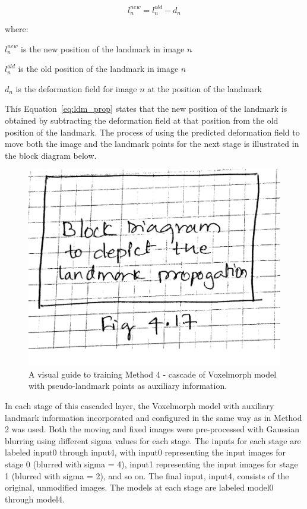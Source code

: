 \documentclass{report}
\begin{document}
	\begin{equation}\label{eq:ldm_prop}
		l_n^{new} = l_n^{old} - d_n
	\end{equation}
	
	where:
	
	$l_n^{new}$ is the new position of the landmark in image $n$
	
	$l_n^{old}$ is the old position of the landmark in image $n$
	
	$d_n$ is the deformation field for image $n$ at the position of the landmark
	
	This Equation~\ref{eq:ldm_prop} states that the new position of the landmark is obtained by subtracting the deformation field at that position from the old position of the landmark. The process of using the predicted deformation field to move both the image and the landmark points for the next stage is illustrated in the block diagram below.
	
	\begin{figure}[h!]
		\centering
		\includegraphics[width=0.6\columnwidth]{resources/chapter4/block_diagram_method_4.png}
		\caption{A visual guide to training Method 4 - cascade of Voxelmorph model with pseudo-landmark points as auxiliary information.}
		\label{fig:block_method4}
	\end{figure}
	
	In each stage of this cascaded layer, the Voxelmorph model with auxiliary landmark information incorporated and configured in the same way as in Method 2 was used. Both the moving and fixed images were pre-processed with Gaussian blurring using different sigma values for each stage. The inputs for each stage are labeled input0 through input4, with input0 representing the input images for stage 0 (blurred with sigma = 4), input1 representing the input images for stage 1 (blurred with sigma = 2), and so on. The final input, input4, consists of the original, unmodified images. The models at each stage are labeled model0 through model4.
	
\end{document}
